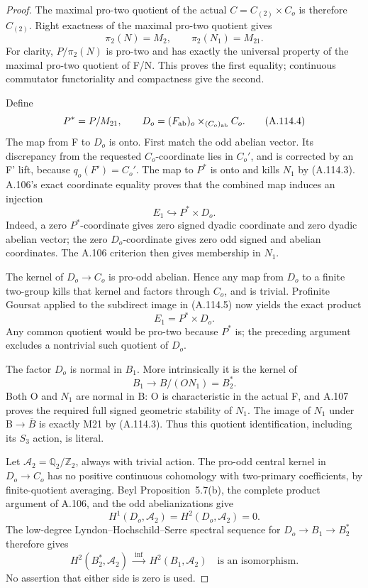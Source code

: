 \begin{proof}
The maximal pro-two quotient of the actual \(C=C_{(2)}\times C_o\) is therefore \(C_{(2)}\). Right exactness of the maximal pro-two quotient gives
\[
\pi_2(N)=M_2,\qquad \pi_2(N_1)=M_{21}.                         \tag{A.114.3}
\]
For clarity, \(P/\pi_2(N)\) is pro-two and has exactly the universal property of the maximal pro-two quotient of F/N. This proves the first equality; continuous commutator functoriality and compactness give the second.

Define
\[
P^*=P/M_{21},\qquad
D_o=(F_{\rm ab})_o\times_{(C_o)_{\rm ab}}C_o.                   \tag{A.114.4}
\]
The map from F to \(D_o\) is onto. First match the odd abelian vector. Its discrepancy from the requested \(C_o\)-coordinate lies in \(C_o'\), and is corrected by an F' lift, because \(q_o(F')=C_o'\). The map to \(P^*\) is onto and kills \(N_1\) by (A.114.3). A.106's exact coordinate equality proves that the combined map induces an injection
\[
E_1\hookrightarrow P^*\times D_o.                             \tag{A.114.5}
\]
Indeed, a zero \(P^*\)-coordinate gives zero signed dyadic coordinate and zero dyadic abelian vector; the zero \(D_o\)-coordinate gives zero odd signed and abelian coordinates. The A.106 criterion then gives membership in \(N_1\).

The kernel of \(D_o\to C_o\) is pro-odd abelian. Hence any map from \(D_o\) to a finite two-group kills that kernel and factors through \(C_o\), and is trivial. Profinite Goursat applied to the subdirect image in (A.114.5) now yields the exact product
\[
E_1=P^*\times D_o.                                            \tag{A.114.6}
\]
Any common quotient would be pro-two because \(P^*\) is; the preceding argument excludes a nontrivial such quotient of \(D_o\).

The factor \(D_o\) is normal in \(B_1\). More intrinsically it is the kernel of
\[
B_1\longrightarrow B/(ON_1)=B_2^*.
\]
Both O and \(N_1\) are normal in B: O is characteristic in the actual F, and A.107 proves the required full signed geometric stability of \(N_1\). The image of \(N_1\) under B\(\to\)\(\overline B\) is exactly M21 by (A.114.3). Thus this quotient identification, including its \(S_3\) action, is literal.

Let \(\mathcal A_2=\mathbb Q_2/\mathbb Z_2\), always with trivial action. The pro-odd central kernel in \(D_o\to C_o\) has no positive continuous cohomology with two-primary coefficients, by finite-quotient averaging. Beyl Proposition~5.7(b), the complete product argument of A.106, and the odd abelianizations give
\[
H^1(D_o,\mathcal A_2)=H^2(D_o,\mathcal A_2)=0.                 \tag{A.114.7}
\]
The low-degree Lyndon--Hochschild--Serre spectral sequence for \(D_o\to B_1\to B_2^*\) therefore gives
\[
H^2(B_2^*,\mathcal A_2)\ \xrightarrow{\ \mathrm{inf}\ }\ 
H^2(B_1,\mathcal A_2)
\quad\text{is an isomorphism}.                               \tag{A.114.8}
\]
No assertion that either side is zero is used.


\end{proof}
